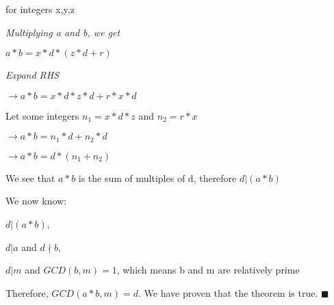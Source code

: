 \documentclass{report}
\begin{document}
    for integers x,y,z
    
    \textit{Multiplying a and b, we get}
    
    $a*b = x*d*(z*d+r)$
    
    \textit{Expand RHS}
    
    $\rightarrow a*b = x*d*z*d + r*x*d$
    
    Let some integers $n_{1} = x*d*z$ and $n_{2} = r*x$
    
    $\rightarrow a*b = n_{1}*d + n_{2}*d$
    
    $\rightarrow a*b = d*(n_{1} + n_{2})$
    
    We see that $a*b$ is the sum of multiples of d, therefore $d | (a*b)$
    
    \medskip
    
    We now know: 
    
    $d | (a*b)$,
    
    $d | a$ and $d \nmid b$,
    
    $d | m$ and $GCD(b,m) = 1$, which means b and m are relatively prime
    
    Therefore, $GCD(a*b, m) = d$. We have proven that the theorem is true. $\blacksquare$
    
    
\end{document}
